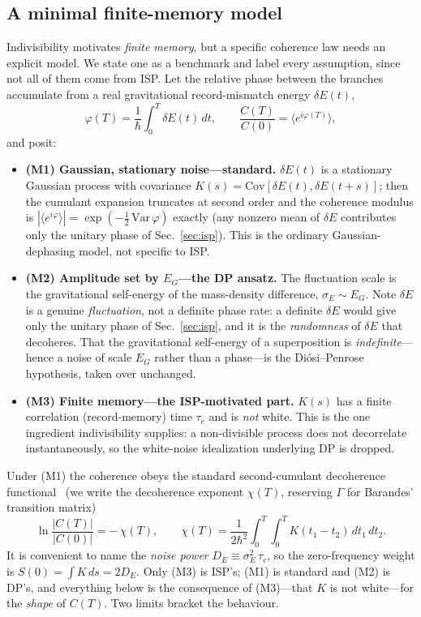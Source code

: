 \documentclass[aps,prd,onecolumn,amsmath,amssymb,nofootinbib,superscriptaddress]{revtex4-2}
\begin{document}
\subsection{A minimal finite-memory model}\label{subsec:model}

Indivisibility motivates \emph{finite memory}, but a specific coherence law needs an explicit model.
We state one as a benchmark and label every assumption, since not all of them come from ISP. Let the
relative phase between the branches accumulate from a real gravitational record-mismatch energy
$\delta E(t)$,
\begin{equation}
\varphi(T)=\frac{1}{\hbar}\int_0^T \delta E(t)\,dt,\qquad
\frac{C(T)}{C(0)}=\big\langle e^{i\varphi(T)}\big\rangle,
\end{equation}
and posit:
\begin{itemize}
\item \textbf{(M1) Gaussian, stationary noise---standard.} $\delta E(t)$ is a stationary Gaussian
process with covariance $K(s)=\mathrm{Cov}[\delta E(t),\delta E(t+s)]$; then the cumulant expansion
truncates at second order and the coherence modulus is $|\langle e^{i\varphi}\rangle|=\exp(-\tfrac12
\,\mathrm{Var}\,\varphi)$ exactly (any nonzero mean of $\delta E$ contributes only the unitary phase
of Sec.~\ref{sec:isp}). This is the ordinary Gaussian-dephasing model, not specific to ISP.
\item \textbf{(M2) Amplitude set by $E_G$---the DP ansatz.} The fluctuation scale is the
gravitational self-energy of the mass-density difference, $\sigma_E\sim E_G$. Note $\delta E$ is a
genuine \emph{fluctuation}, not a definite phase rate: a definite $\delta E$ would give only the
unitary phase of Sec.~\ref{sec:isp}, and it is the \emph{randomness} of $\delta E$ that decoheres.
That the gravitational self-energy of a superposition is \emph{indefinite}---hence a noise of scale
$E_G$ rather than a phase---is the Di\'osi--Penrose hypothesis, taken over unchanged.
\item \textbf{(M3) Finite memory---the ISP-motivated part.} $K(s)$ has a finite correlation
(record-memory) time $\tau_c$ and is \emph{not} white. This is the one ingredient indivisibility
supplies: a non-divisible process does not decorrelate instantaneously, so the white-noise
idealization underlying DP is dropped.
\end{itemize}

Under (M1) the coherence obeys the standard second-cumulant decoherence functional~\cite{R15,R21}
(we write the decoherence exponent $\chi(T)$, reserving $\Gamma$ for Barandes' transition matrix)
\begin{equation}
\ln\frac{|C(T)|}{|C(0)|}=-\,\chi(T),\qquad
\chi(T)=\frac{1}{2\hbar^2}\int_0^T\!\!\int_0^T K(t_1-t_2)\,dt_1\,dt_2 .
\end{equation}
It is convenient to name the \emph{noise power} $D_E\equiv\sigma_E^2\,\tau_c$, so the zero-frequency
weight is $S(0)=\int K\,ds=2D_E$. Only (M3) is ISP's; (M1) is standard and (M2) is DP's, and
everything below is the consequence of (M3)---that $K$ is not white---for the \emph{shape} of $C(T)$.
Two limits bracket the behaviour.
\end{document}
